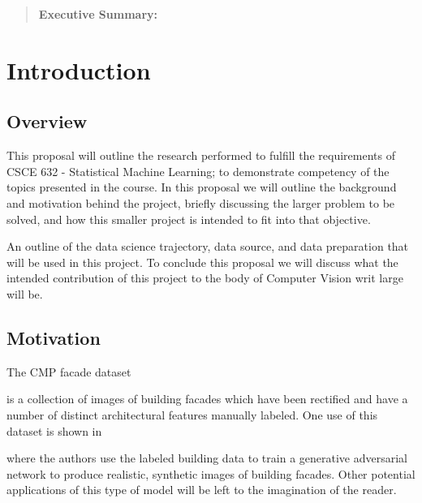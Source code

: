 \documentclass[sigplan,nonacm]{acmart}
\begin{document}
\title{}

\author{Brandon Hosley}

\begin{abstract}
	\textbf{Executive Summary:} 

\end{abstract}

\received{\today}
\maketitle

\section{Introduction}
\subsection{Overview}

This proposal will outline the research performed to fulfill the requirements of 
CSCE 632 - Statistical Machine Learning; 
to demonstrate competency of the topics presented in the course.
In this proposal we will outline the background and motivation behind the project,
briefly discussing the larger problem to be solved, and how this smaller project
is intended to fit into that objective.

An outline of the data science trajectory, data source, and data preparation that
will be used in this project.
To conclude this proposal we will discuss what the intended contribution of this project
to the body of Computer Vision writ large will be.


\subsection{Motivation}

The CMP facade dataset 

\cite{}

is a collection of images of building facades which have been rectified and
have a number of distinct architectural features manually labeled.
One use of this dataset is shown in 

\cite{}

where the authors use the labeled building data to train a generative adversarial network
to produce realistic, synthetic images of building facades.
Other potential applications of this type of model will be left to the imagination of the reader.
\end{document}
